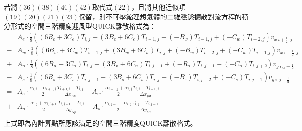 \documentclass[12pt]{article}
\begin{document}
若將$(36)(38)(40)(42)$取代式$(22)$，且將其他近似項$(19)(20)(21)(23)$保留，則不可壓縮理想氣體的二維穩態擴散對流方程的積分形式的空間三階精度迎風型QUICK離散格式為：
\begin{equation}
\begin{split}
  &A_{e} \cdot \frac{1}{8}\left((6B_{e}+3C_{e})T_{i,j}+(3B_{e}+6C_{e})T_{i+1,j}+(-B_{w})T_{i-1,j}+(-C_{w})T_{i+2,j}\right) v_{x\ i+\frac{1}{2},j} \\
  - &A_{w} \cdot \frac{1}{8}\left((6B_{w}+3C_{w})T_{i-1,j}+(3B_{w}+6C_{w})T_{i,j}+(-B_{w})T_{i-2,j}+(-C_{w})T_{i+1,j}\right) v_{x\ i-\frac{1}{2},j} \\
  + &A_{n} \cdot \frac{1}{8}\left((6B_{n}+3C_{n})T_{i,j}+(3B_{n}+6C_{n})T_{i,j+1}+(-B_{n})T_{i,j-1}+(-C_{n})T_{i,j+2}\right) v_{y\ i,j+\frac{1}{2}} \\
  - &A_{s} \cdot \frac{1}{8}\left((6B_{s}+3C_{s})T_{i,j-1}+(3B_{s}+6C_{s})T_{i,j}+(-B_{s})T_{i,j-2}+(-C_{s})T_{i,j+1}\right) v_{y\ i,j-\frac{1}{2}}\\
  = &A_{e} \cdot \frac{\alpha_{i,j} + \alpha_{i+1,j}}{2}\frac{T_{i+1,j}-T_{i,j}}{\Delta x_{Ep}}- A_{w} \cdot \frac{\alpha_{i-1,j} + \alpha_{i,j}}{2}\frac{T_{i,j}-T_{i-1,j}}{\Delta x_{pW}} \\
  + &A_{n} \cdot \frac{\alpha_{i,j} + \alpha_{i,j+1}}{2}\frac{T_{i,j+1}-T_{i,j}}{\Delta y_{Np}} - A_{s} \cdot \frac{\alpha_{i,j-1} + \alpha_{i,j}}{2}\frac{T_{i,j}-T_{i,j-1}}{\Delta y_{pS}} \\
\end{split}
\end{equation}
\noindent 上式即為內計算點所應該滿足的空間三階精度QUICK離散格式。\\
\end{document}
